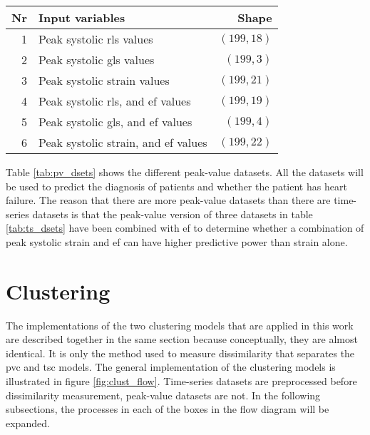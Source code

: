 \begin{table*}[h]
    \centering
    \begin{tabular}{ rlr }
        \toprule
        Nr & Input variables                                           & Shape \\
        \midrule                              
        1  & Peak systolic \acrshort{rls} values                       & $(199,18)$ \\
        2  & Peak systolic \acrshort{gls} values                       & $(199,3)$  \\
        3  & Peak systolic strain values                               & $(199,21)$ \\
        4  & Peak systolic \acrshort{rls}, and \acrshort{ef} values    & $(199,19)$ \\
        5  & Peak systolic \acrshort{gls}, and \acrshort{ef} values    & $(199,4)$  \\
        6  & Peak systolic strain, and \acrshort{ef} values            & $(199,22)$ \\
        \bottomrule
    \end{tabular}
    \caption{Peak-value datasets. The ''Shape'' parameter is indicates: (Number of objects in the dataset, Number of dimensions used to represent each individual object).}
    \label{tab:pv_dsets}
\end{table*}

Table \ref{tab:pv_dsets} shows the different peak-value datasets. All the datasets will be used to predict the diagnosis of patients and whether the patient has heart failure. The reason that there are more peak-value datasets than there are time-series datasets is that the peak-value version of three datasets in table \ref{tab:ts_dsets} have been combined with \acrshort{ef} to determine whether a combination of peak systolic strain and \acrshort{ef} can have higher predictive power than strain alone.

\section{Clustering} \label{sec:meth_clust}

The implementations of the two clustering models that are applied in this work are described together in the same section because conceptually, they are almost identical. It is only the method used to measure dissimilarity that separates the \acrshort{pvc} and \acrshort{tsc} models. The general implementation of the clustering models is illustrated in figure \ref{fig:clust_flow}. Time-series datasets are preprocessed before dissimilarity measurement, peak-value datasets are not. In the following subsections, the processes in each of the boxes in the flow diagram will be expanded.

